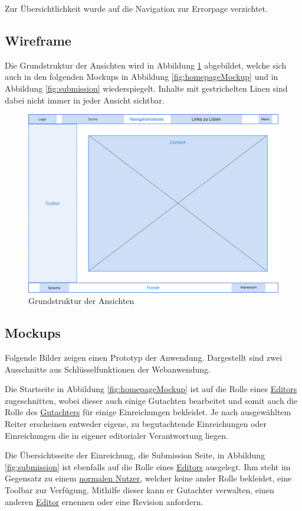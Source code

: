 Zur Übersichtlichkeit wurde auf die Navigation zur Errorpage verzichtet.

\subsection{Wireframe}

Die Grundstruktur der Ansichten wird in Abbildung \ref{fig:wireframe} abgebildet, welche sich auch in den folgenden Mockups in Abbildung \ref{fig:homepageMockup} und in Abbildung \ref{fig:submission} wiederspiegelt.
Inhalte mit gestrichelten Linen sind dabei nicht immer in jeder Ansicht sichtbar.

\begin{figure}[H]
	\centering
	\includegraphics[width=0.85\linewidth]{graphics/Wireframe-png}
	\caption{Grundstruktur der Ansichten}
	\label{fig:wireframe}
\end{figure}

\subsection{Mockups}

Folgende Bilder zeigen einen Prototyp der Anwendung.
Dargestellt sind zwei Ausschnitte aus Schlüsselfunktionen der Webanwendung.

Die Startseite in Abbildung \ref{fig:homepageMockup} ist auf die Rolle eines \hyperref[mkrit:editor]{Editors} zugeschnitten, wobei dieser auch einige
Gutachten bearbeitet und somit auch die Rolle des \hyperref[mkrit:gutachter]{Gutachters} für einige Einreichungen bekleidet.
Je nach ausgewähltem Reiter erscheinen entweder eigene, zu begutachtende Einreichungen oder Einreichungen die in eigener editorialer Verantwortung liegen.

Die Übersichtsseite der Einreichung, die Submission Seite, in Abbildung \ref{fig:submission} ist ebenfalls auf die Rolle eines \hyperref[mkrit:editor]{Editors} ausgelegt.
Ihm steht im Gegensatz zu einem \hyperref[mkrit:angemeldet]{normalen Nutzer}, welcher keine ander Rolle bekleidet, eine Toolbar zur Verfügung.
Mithilfe dieser kann er Gutachter verwalten, einen anderen \hyperref[mkrit:editor]{Editor} ernennen oder eine Revision anfordern.


